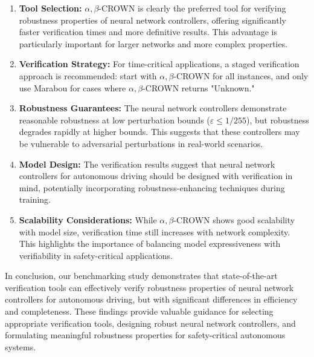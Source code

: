 \begin{enumerate}
    \item \textbf{Tool Selection:} $\alpha, \beta$-CROWN is clearly the preferred tool for verifying robustness properties of neural network controllers, offering significantly faster verification times and more definitive results. This advantage is particularly important for larger networks and more complex properties.

    \item \textbf{Verification Strategy:} For time-critical applications, a staged verification approach is recommended: start with $\alpha, \beta$-CROWN for all instances, and only use Marabou for cases where $\alpha, \beta$-CROWN returns "Unknown."

    \item \textbf{Robustness Guarantees:} The neural network controllers demonstrate reasonable robustness at low perturbation bounds ($\varepsilon \leq 1/255$), but robustness degrades rapidly at higher bounds. This suggests that these controllers may be vulnerable to adversarial perturbations in real-world scenarios.


    \item \textbf{Model Design:} The verification results suggest that neural network controllers for autonomous driving should be designed with verification in mind, potentially incorporating robustness-enhancing techniques during training.

    \item \textbf{Scalability Considerations:} While $\alpha, \beta$-CROWN shows good scalability with model size, verification time still increases with network complexity. This highlights the importance of balancing model expressiveness with verifiability in safety-critical applications.
\end{enumerate}

In conclusion, our benchmarking study demonstrates that state-of-the-art verification tools can effectively verify robustness properties of neural network controllers for autonomous driving, but with significant differences in efficiency and completeness. These findings provide valuable guidance for selecting appropriate verification tools, designing robust neural network controllers, and formulating meaningful robustness properties for safety-critical autonomous systems.
